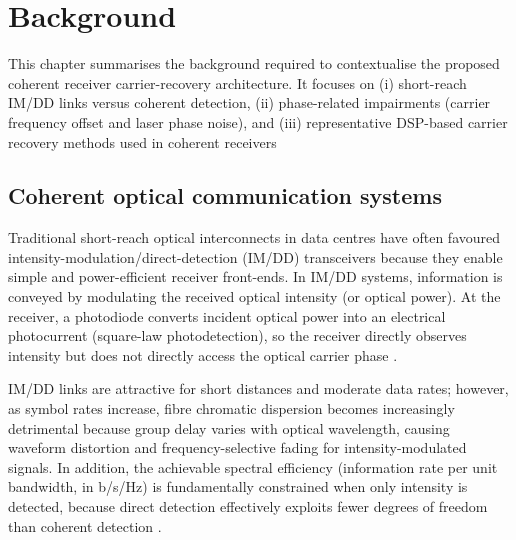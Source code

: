 
\chapter{Background}\label{Background}
This chapter summarises the background required to contextualise the proposed coherent
receiver carrier-recovery architecture. It focuses on (i) short-reach IM/DD links versus
coherent detection, (ii) phase-related impairments (carrier frequency offset and laser
phase noise), and (iii) representative DSP-based carrier recovery methods used in coherent
receivers %

\section{Coherent optical communication systems}
Traditional short-reach optical interconnects in data centres have often favoured
intensity-modulation/direct-detection (IM/DD) transceivers because they enable simple and
power-efficient receiver front-ends. In IM/DD systems,
information is conveyed by modulating the received optical intensity (or optical power).
At the receiver, a photodiode converts incident optical power into an electrical
photocurrent (square-law photodetection), so the receiver directly observes intensity but
does not directly access the optical carrier phase \cite{Wartak2013OpticalReceivers,KahnHo2004JSTQE}.

IM/DD links are attractive for short distances and moderate data rates; however, as symbol
rates increase, fibre chromatic dispersion becomes increasingly detrimental because group
delay varies with optical wavelength, causing waveform distortion and frequency-selective
fading for intensity-modulated signals. In addition, the achievable spectral efficiency
(information rate per unit bandwidth, in b/s/Hz) is fundamentally constrained when only
intensity is detected, because direct detection effectively exploits fewer degrees of
freedom than coherent detection \cite{KahnHo2004JSTQE}.
 
